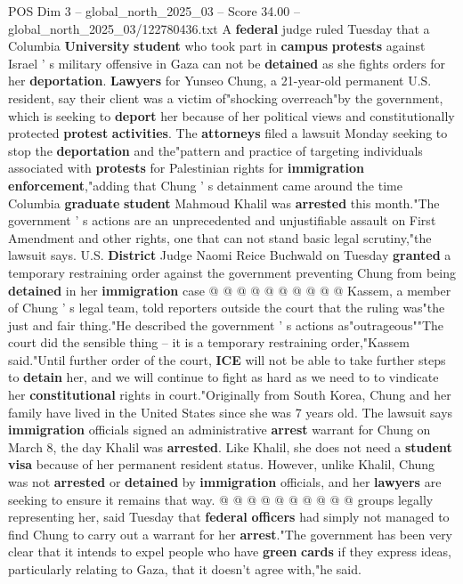 \begin{textsample}{POS Dim 3 – global\_north\_2025\_03 – Score 34.00 – global\_north\_2025\_03/122780436.txt}  \label{ex:f3_pos_026}
A \textbf{federal} judge ruled Tuesday that a Columbia \textbf{University} \textbf{student} who took part in \textbf{campus} \textbf{protests} against Israel ' s military offensive in Gaza can not be \textbf{detained} as she fights orders for her \textbf{deportation}. \textbf{Lawyers} for Yunseo Chung, a 21-year-old permanent U.S. resident, say their client was a victim of"shocking overreach"by the government, which is seeking to \textbf{deport} her because of her political views and constitutionally protected \textbf{protest} \textbf{activities}.
The \textbf{attorneys} filed a lawsuit Monday seeking to stop the \textbf{deportation} and the"pattern and practice of targeting individuals associated with \textbf{protests} for Palestinian rights for \textbf{immigration} \textbf{enforcement},"adding that Chung ' s detainment came around the time Columbia \textbf{graduate} \textbf{student} Mahmoud Khalil was \textbf{arrested} this month."The government ' s actions are an unprecedented and unjustifiable assault on First Amendment and other rights, one that can not stand basic legal scrutiny,"the lawsuit says.
U.S. \textbf{District} Judge Naomi Reice Buchwald on Tuesday \textbf{granted} a temporary restraining order against the government preventing Chung from being \textbf{detained} in her \textbf{immigration} case @ @ @ @ @ @ @ @ @ @ Kassem, a member of Chung ' s legal team, told reporters outside the court that the ruling was"the just and fair thing."He described the government ' s actions as"outrageous""The court did the sensible thing -- it is a temporary restraining order,"Kassem said."Until further order of the court, \textbf{ICE} will not be able to take further steps to \textbf{detain} her, and we will continue to fight as hard as we need to to vindicate her \textbf{constitutional} rights in court."Originally from South Korea, Chung and her family have lived in the United States since she was 7 years old.
The lawsuit says \textbf{immigration} officials signed an administrative \textbf{arrest} warrant for Chung on March 8, the day Khalil was \textbf{arrested}.
Like Khalil, she does not need a \textbf{student} \textbf{visa} because of her permanent resident status.
However, unlike Khalil, Chung was not \textbf{arrested} or \textbf{detained} by \textbf{immigration} officials, and her \textbf{lawyers} are seeking to ensure it remains that way. @ @ @ @ @ @ @ @ @ @ groups legally representing her, said Tuesday that \textbf{federal} \textbf{officers} had simply not managed to find Chung to carry out a warrant for her \textbf{arrest}."The government has been very clear that it intends to expel people who have \textbf{green} \textbf{cards} if they express ideas, particularly relating to Gaza, that it doesn't agree with,"he said.

\end{textsample}
